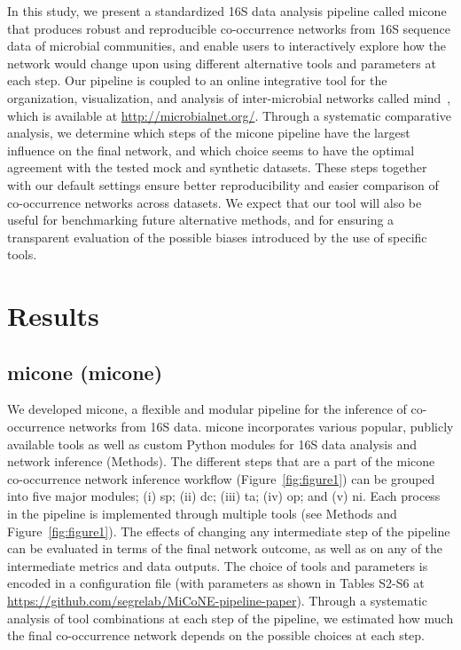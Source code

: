 \documentclass[letterpaper,12pt]{article}
\begin{document}
 In this study, we present a standardized 16S data analysis pipeline called \ac{micone} that produces robust and reproducible co-occurrence networks from 16S sequence data of microbial communities, and enable users to interactively explore how the network would change upon using different alternative tools and parameters at each step.
 Our pipeline is coupled to an online integrative tool for the organization, visualization, and analysis of inter-microbial networks called \ac{mind}~\cite{huResourceComparisonIntegration2022}, which is available at \href{http://microbialnet.org/}{http://microbialnet.org/}.
Through a systematic comparative analysis, we determine which steps of the \ac{micone} pipeline have the largest influence on the final network, and which choice seems to have the optimal agreement with the tested mock and synthetic datasets.
These steps together with our default settings ensure better reproducibility and easier comparison of co-occurrence networks across datasets.
We expect that our tool will also be useful for benchmarking future alternative methods, and for ensuring a transparent evaluation of the possible biases introduced by the use of specific tools.

\section*{Results}

  \subsection*{\acl{micone} (\acs{micone})}

  We developed \ac{micone}, a flexible and modular pipeline for the inference of co-occurrence networks from 16S data.
  \ac{micone} incorporates various popular, publicly available tools as well as custom Python modules for 16S data analysis and network inference (Methods).
  The different steps that are a part of the \ac{micone} co-occurrence network inference workflow (Figure~\ref{fig:figure1}) can be grouped into five major modules; (i) \ac{sp}; (ii) \ac{dc}; (iii) \ac{ta}; (iv) \ac{op}; and (v) \ac{ni}.
  Each process in the pipeline is implemented through multiple tools (see Methods and Figure~\ref{fig:figure1}).
  The effects of changing any intermediate step of the pipeline can be evaluated in terms of the final network outcome, as well as on any of the intermediate metrics and data outputs.
  The choice of tools and parameters is encoded in a configuration file (with parameters as shown in Tables S2-S6 at \href{https://github.com/segrelab/MiCoNE-pipeline-paper}{https://github.com/segrelab/MiCoNE-pipeline-paper}).
  Through a systematic analysis of tool combinations at each step of the pipeline, we estimated how much the final co-occurrence network depends on the possible choices at each step.
\end{document}
